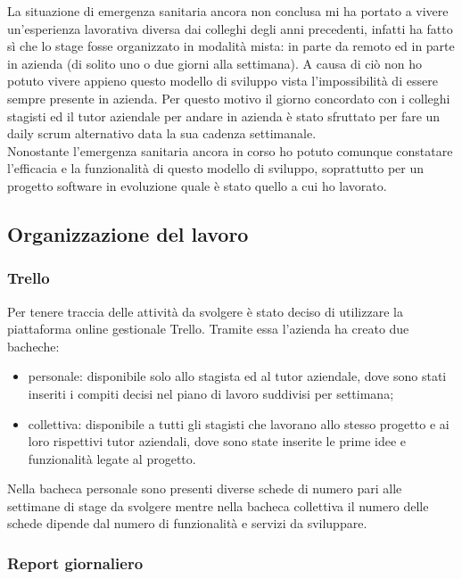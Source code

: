La situazione di emergenza sanitaria ancora non conclusa mi ha portato a vivere un'esperienza lavorativa diversa dai colleghi degli anni precedenti, infatti ha fatto sì che lo stage fosse organizzato in modalità mista: in parte da remoto ed in parte in azienda (di solito uno o due giorni alla settimana). A causa di ciò non ho potuto vivere appieno questo modello di sviluppo vista l'impossibilità di essere sempre presente in azienda. Per questo motivo il giorno concordato con i colleghi stagisti ed il tutor aziendale per andare in azienda è stato sfruttato per fare un daily scrum alternativo data la sua cadenza settimanale.\\ 
Nonostante l'emergenza sanitaria ancora in corso ho potuto comunque constatare l’efficacia e la funzionalità di questo modello di sviluppo, soprattutto per un progetto software in evoluzione quale è stato quello a cui ho lavorato.\\

\subsection{Organizzazione del lavoro}

\subsubsection{Trello}

Per tenere traccia delle attività da svolgere è stato deciso di utilizzare la piattaforma online gestionale Trello. Tramite essa l'azienda ha creato due bacheche:
\begin{itemize}
	\item personale: disponibile solo allo stagista ed al tutor aziendale, dove sono stati inseriti i compiti decisi nel piano di lavoro suddivisi per settimana;
	\item collettiva: disponibile a tutti gli stagisti che lavorano allo stesso progetto e ai loro rispettivi tutor aziendali, dove sono state inserite le prime idee e funzionalità legate al progetto.
\end{itemize}
Nella bacheca personale sono presenti diverse schede di numero pari alle settimane di stage da svolgere mentre nella bacheca collettiva il numero delle schede dipende dal numero di funzionalità e servizi da sviluppare. 

\subsubsection{Report giornaliero}

